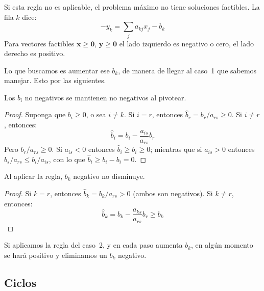 \begin{description}
    Si esta regla no es aplicable,
    el problema máximo no tiene soluciones factibles.
    La fila \(k\) dice:
    \begin{equation*}
      - y_k
        = \sum_j a_{k j} x_j - b_k
    \end{equation*}
    Para vectores factibles
    \(\mathbf{x} \ge \mathbf{0}\),
    \(\mathbf{y} \ge \mathbf{0}\)
    el lado izquierdo es negativo o cero,
    el lado derecho es positivo.

    Lo que buscamos es aumentar ese \(b_k\),
    de manera de llegar al caso~1 que sabemos manejar.
    Esto por las siguientes.
    \begin{proposition}
      \label{prop:caso-2-1}
      Los \(b_i\) no negativos se mantienen no negativos al pivotear.
    \end{proposition}
    \begin{proof}
      Suponga que \(b_i \ge 0\),
      o sea \(i \ne k\).
      Si \(i = r\),
      entonces \(\widehat{b}_r = b_r / a_{r s} \ge 0\).
      Si \(i \ne r\),
      entonces:
      \begin{equation*}
        \widehat{b}_i
          = b_i - \frac{a_{i s}}{a_{r s}} b_r
      \end{equation*}
      Pero \(b_r / a_{r s} \ge 0\).
      Si \(a_{i s} < 0\)
      entonces \(\widehat{b}_i \ge b_i \ge 0\);
      mientras que si \(a_{i s} > 0\)
      entonces \(b_s / a_{r s} \le b_i / a_{i s}\),
      con lo que \(\widehat{b}_i \ge b_i - b_i = 0\).
    \end{proof}
    \begin{proposition}
      Al aplicar la regla,
      \(b_k\) negativo no disminuye.
    \end{proposition}
    \begin{proof}
      Si \(k = r\),
      entonces \(\widehat{b}_k = b_k / a_{r s} > 0\)
      (ambos son negativos).
      Si \(k \ne r\),
      entonces:
      \begin{equation*}
        \widehat{b}_k
          =   b_k - \frac{a_{k s}}{a_{r s}} b_r
          \ge b_k
      \end{equation*}
    \end{proof}
    Si aplicamos la regla del caso~2,
    y en cada paso aumenta \(b_k\),
    en algún momento se hará positivo y eliminamos un \(b_k\) negativo.
  \end{description}

\subsection{Ciclos}
\label{sec:ciclos}

